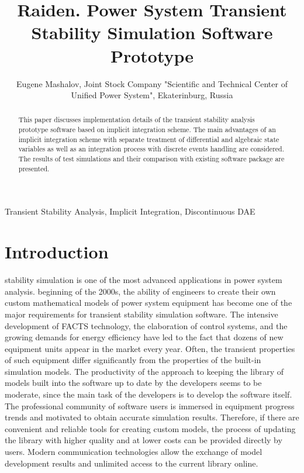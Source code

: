 \documentclass[lettersize,journal]{IEEEtran}
\begin{document}
\title{Raiden. Power System Transient Stability Simulation Software Prototype}

\author {Eugene Mashalov, Joint Stock Company "Scientific and Technical Center of Unified Power System", Ekaterinburg, Russia}




\maketitle

\begin{abstract}
This paper discusses implementation details of the transient stability analysis prototype software based on implicit integration scheme. The main advantages of an implicit integration scheme with separate treatment of differential and algebraic state variables as well as an integration process with discrete events handling are considered. The results of test simulations and their comparison with existing software package are presented.
\end{abstract}

\begin{IEEEkeywords}
Transient Stability Analysis, Implicit Integration, Discontinuous DAE
\end{IEEEkeywords}

\section{Introduction}
 stability simulation is one of the most advanced applications in power system analysis.
beginning of the 2000s, the ability of engineers to create their own custom mathematical models of power system equipment 
has become one of the major requirements for transient stability simulation software. The intensive development of FACTS technology, 
the elaboration of control systems, and the growing demands for energy efficiency have led to the fact that dozens 
of new equipment units appear in the market every year. Often, the transient properties of such equipment differ significantly from the properties of 
the built-in simulation models. The productivity of the approach to keeping the library of models built into the software up to date by the developers 
seems to be moderate, since the main task of the developers is to develop the software itself. 
The professional community of software users is immersed in equipment progress trends and motivated to obtain accurate simulation results. 
Therefore, if there are convenient and reliable tools for creating custom models, the process of updating the library with higher quality and at lower costs 
can be provided directly by users. Modern communication technologies allow the exchange of model development results and unlimited access to the current library online.
\end{document}
